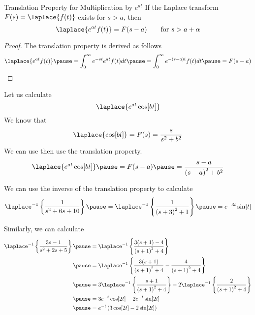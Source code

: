 \documentclass{beamer}
\begin{document}
\begin{frame}
\begin{block}{Translation Property for Multiplication by $e^{at}$}
If the Laplace transform $F(s)=\laplace\{f(t)\}$ exists for $s>a$, then
\begin{equation*}
\laplace\{e^{at} f(t)\}=F(s-a)\qquad\text{for}~s>a+\alpha
\end{equation*}
\end{block}\pause
\begin{proof}
The translation property is derived as follows
\begin{equation*}
\laplace\{e^{at} f(t)\}\pause
=\int^\infty_0 e^{-st}e^{at} f(t) dt\pause
=\int^\infty_0 e^{-(s-a)t} f(t) dt\pause
=F(s-a)
\end{equation*}
\end{proof}
\end{frame}

\begin{frame}
\begin{example}
Let us calculate
\begin{equation*}
\laplace\{e^{at}\cos[bt]\}
\end{equation*}\pause
We know that
\begin{equation*}
\laplace\{\cos[bt]\}=F(s)=\dfrac{s}{s^2+b^2}
\end{equation*}\pause
We can use then use the translation property.
\begin{equation*}
\laplace\{e^{at}\cos[bt]\}\pause
=F(s-a)\pause
=\dfrac{s-a}{{(s-a)}^2+b^2}
\end{equation*}
\end{example}\pause
\begin{example}
We can use the inverse of the translation property to calculate
\begin{equation*}
\laplace^{-1}\left\{\dfrac{1}{s^2+6s+10}\right\}\pause
=\laplace^{-1}\left\{\dfrac{1}{{(s+3)}^2+1}\right\}\pause
=e^{-3t}\sin[t]
\end{equation*}
\end{example}
\end{frame}

\begin{frame}
\begin{example}
Similarly, we can calculate
\begin{equation*}
\begin{aligned}
\laplace^{-1}\left\{\dfrac{3s-1}{s^2+2s+5}\right\}\pause
&=\laplace^{-1}\left\{\dfrac{3(s+1)-4}{{(s+1)}^2+4}\right\}\\\pause
&=\laplace^{-1}\left\{\dfrac{3(s+1)}{{(s+1)}^2+4}-\dfrac{4}{{(s+1)}^2+4}\right\}\\\pause
&=3\laplace^{-1}\left\{\dfrac{s+1}{{(s+1)}^2+4}\right\}-2\laplace^{-1}\left\{\dfrac{2}{{(s+1)}^2+4}\right\}\\\pause
&=3e^{-t}\cos[2t]-2e^{-t}\sin[2t]\\\pause
&=e^{-t}\left(3\cos[2t]-2\sin[2t]\right)
\end{aligned}
\end{equation*}
\end{example}
\end{frame}
\end{document}
